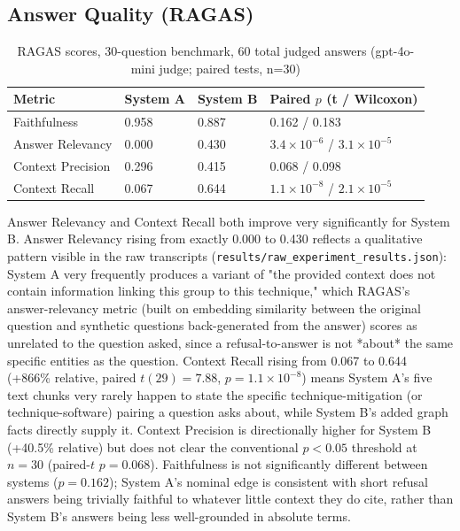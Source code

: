 \documentclass[conference]{IEEEtran}
\begin{document}
\subsection{Answer Quality (RAGAS)}
\begin{table}[h]
\centering
\caption{RAGAS scores, 30-question benchmark, 60 total judged answers (gpt-4o-mini judge; paired tests, n=30)}
\label{tab:results}
\begin{tabular}{@{}llll@{}}
\toprule
Metric & System A & System B & Paired $p$ (t / Wilcoxon) \\
\midrule
Faithfulness & 0.958 & 0.887 & 0.162 / 0.183 \\
Answer Relevancy & 0.000 & 0.430 & $3.4\times10^{-6}$ / $3.1\times10^{-5}$ \\
Context Precision & 0.296 & 0.415 & 0.068 / 0.098 \\
Context Recall & 0.067 & 0.644 & $1.1\times10^{-8}$ / $2.1\times10^{-5}$ \\
\bottomrule
\end{tabular}
\end{table}

Answer Relevancy and Context Recall both improve very significantly for
System B. Answer Relevancy rising from exactly 0.000 to 0.430 reflects a
qualitative pattern visible in the raw transcripts
(\texttt{results/raw\_experiment\_results.json}): System A very frequently
produces a variant of "the provided context does not contain information
linking this group to this technique," which RAGAS's answer-relevancy
metric (built on embedding similarity between the original question and
synthetic questions back-generated from the answer) scores as unrelated to
the question asked, since a refusal-to-answer is not *about* the same
specific entities as the question. Context Recall rising from 0.067 to
0.644 (+866\% relative, paired $t(29)=7.88$, $p=1.1\times10^{-8}$) means
System A's five text chunks very rarely happen to state the specific
technique-mitigation (or technique-software) pairing a question asks about,
while System B's added graph facts directly supply it. Context Precision is
directionally higher for System B (+40.5\% relative) but does not clear the
conventional $p<0.05$ threshold at $n=30$ (paired-$t$ $p=0.068$). Faithfulness
is not significantly different between systems ($p=0.162$); System A's
nominal edge is consistent with short refusal answers being trivially
faithful to whatever little context they do cite, rather than System B's
answers being less well-grounded in absolute terms.
\end{document}
